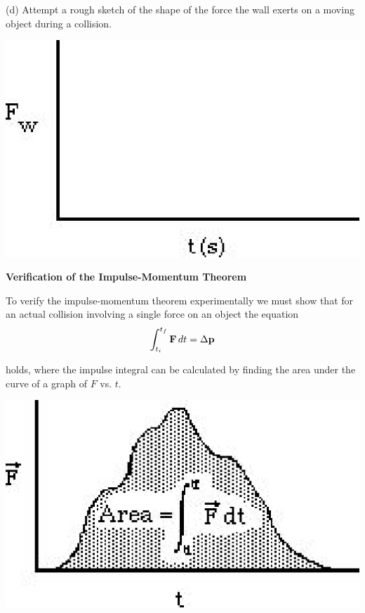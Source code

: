 (d) Attempt a rough sketch of the shape of the force the wall exerts on a moving
object during a collision.

\vspace{0.3cm}
{\par\centering \includegraphics{impulse/impulse_fig2.eps} \par}
\vspace{0.3cm}

\textbf{Verification of the Impulse-Momentum Theorem} 

To verify the impulse-momentum theorem experimentally we must show that for
an actual collision involving a single force on an object the equation
\[
\int_{t_{i}}^{t_{f}}{\bf F}\,dt=\Delta {\bf p}\]


holds, where the impulse integral can be calculated by finding the area under
the curve of a graph of $F$ vs. $t$.

\vspace{0.3cm}
{\par\centering \includegraphics{impulse/impulse_fig3.eps} \par}
\vspace{0.3cm}

